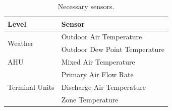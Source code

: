 \begin{table}
\centering
\caption{Necessary sensors.}
\label{tab:NecessarySensors}
\begin{tabular}{l l}
\toprule
Level & Sensor \\
\midrule\midrule
\multirow{2}{*}{Weather} & Outdoor Air Temperature \\
 & Outdoor Dew Point Temperature \\ \midrule
\multirow{1}{*}{AHU}              & Mixed Air Temperature      \\
\midrule
\multirow{3}{*}{Terminal Units}  & Primary Air Flow Rate     \\
                                 & Discharge Air Temperature \\
                                 & Zone Temperature          \\
\bottomrule
\end{tabular}
\end{table}



%
%
%
%
%
%
%
%


